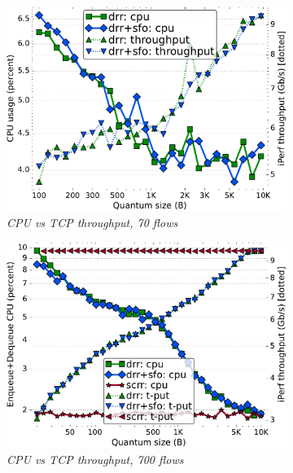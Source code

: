 \begin{figure}[th!]
  \centering
  \begin{subfigure}[t]{.30\linewidth}
    \centering
    \includegraphics[width=0.95\linewidth]{figs/burst_cn_6t1x10_mss_1000_kp_bw_drr_basic_fq_drr.pdf}
    \caption{\small{\textit{CPU vs TCP throughput, 70 flows}}}
    \label{fig:cpu-quanta-tcp-lat-10f}
  \end{subfigure}
  \begin{subfigure}[t]{.30\linewidth}
    \centering
    \includegraphics[width=0.95\linewidth]{figs/burst_cn_6t1x100_kp_bw_drr_basic_fq_drr_scrr-neia.pdf}
    \caption{\small{\textit{CPU vs TCP throughput, 700 flows}}}
    \label{fig:cpu-quanta-tcp-lat-100f}
  \end{subfigure}
  \begin{subfigure}[t]{.30\linewidth}

\end{subfigure}
\end{figure}
